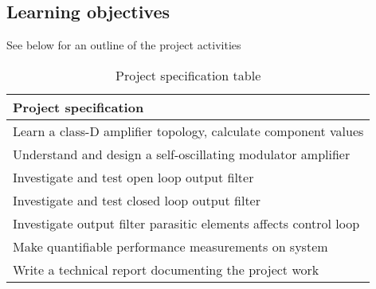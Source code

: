\subsection{Learning objectives}
See below for an outline of the project activities
\begin{table}[ht!]
	\centering
	\begin{tabular}{@{}l@{}}
		\toprule
		\textbf{Project specification}									\\ \midrule
		Learn a class-D amplifier topology, calculate component values	\\
		Understand and design a self-oscillating modulator amplifier	\\
		Investigate and test open loop output filter					\\
		Investigate and test closed loop output filter					\\
		Investigate output filter parasitic elements affects control loop\\
		Make quantifiable performance measurements on system			\\
		Write a technical report documenting the project work			\\ \bottomrule
	\end{tabular}
	\caption{Project specification table}
	\label{tab:specifications}
\end{table}